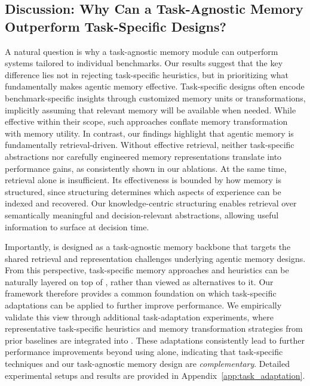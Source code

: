 \subsection{Discussion: Why Can a Task-Agnostic Memory Outperform Task-Specific Designs?}


A natural question is why a task-agnostic memory module can outperform systems tailored to individual benchmarks.
Our results suggest that the key difference lies not in rejecting task-specific heuristics, but in prioritizing what fundamentally makes agentic memory effective.
Task-specific designs often encode benchmark-specific insights through customized memory units or transformations, implicitly assuming that relevant memory will be available when needed.
While effective within their scope, such approaches conflate memory transformation with memory utility.
In contrast, our findings highlight that agentic memory is fundamentally retrieval-driven.
Without effective retrieval, neither task-specific abstractions nor carefully engineered memory representations translate into performance gains, as consistently shown in our ablations.
At the same time, retrieval alone is insufficient.
Its effectiveness is bounded by how memory is structured, since structuring determines which aspects of experience can be indexed and recovered.
Our knowledge-centric structuring enables retrieval over semantically meaningful and decision-relevant abstractions, allowing useful information to surface at decision time.

Importantly, \plugmem is designed as a task-agnostic memory backbone that targets the shared retrieval and representation challenges underlying agentic memory designs.
From this perspective, task-specific memory approaches and heuristics can be naturally layered on top of \plugmem, rather than viewed as alternatives to it. Our framework therefore provides a common foundation on which task-specific adaptations can be applied to further improve performance.
We empirically validate this view through additional task-adaptation experiments, where representative task-specific heuristics and memory transformation strategies from prior baselines are integrated into \plugmem.
These adaptations consistently lead to further performance improvements beyond using \plugmem alone, indicating that task-specific techniques and our task-agnostic memory design are \textit{complementary}. Detailed experimental setups and results are provided in Appendix~\ref{app:task_adaptation}.